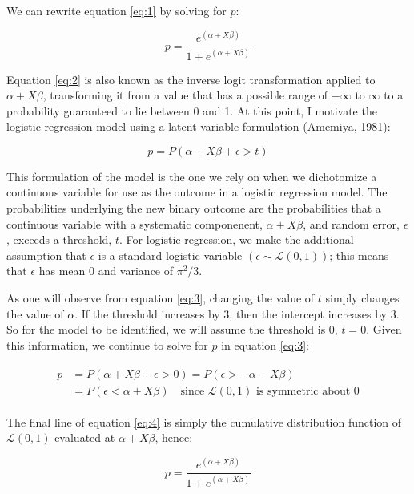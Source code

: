 \documentclass[
  english,
  doc]{apa6}
\begin{document}
We can rewrite equation \eqref{eq:1} by solving for \(p\):

\begin{equation} \label{eq:2}
p=\frac{e^{(\alpha+X\beta)}}{1+e^{(\alpha+X\beta)}}
\end{equation}

Equation \eqref{eq:2} is also known as the inverse logit transformation applied to \(\alpha+X\beta\), transforming it from a value that has a possible range of \(-\infty\) to \(\infty\) to a probability guaranteed to lie between 0 and 1. At this point, I motivate the logistic regression model using a latent variable formulation (Amemiya, 1981):

\begin{equation} \label{eq:3}
p=P(\alpha+X\beta+\epsilon>t)
\end{equation}

This formulation of the model is the one we rely on when we dichotomize a continuous variable for use as the outcome in a logistic regression model. The probabilities underlying the new binary outcome are the probabilities that a continuous variable with a systematic componenent, \(\alpha + X\beta\), and random error, \(\epsilon\), exceeds a threshold, \(t\). For logistic regression, we make the additional assumption that \(\epsilon\) is a standard logistic variable \((\epsilon\sim\mathcal{L}(0, 1))\); this means that \(\epsilon\) has mean 0 and variance of \(\pi^2/3\).

As one will observe from equation \eqref{eq:3}, changing the value of \(t\) simply changes the value of \(\alpha\). If the threshold increases by 3, then the intercept increases by 3. So for the model to be identified, we will assume the threshold is 0, \(t=0\). Given this information, we continue to solve for \(p\) in equation \eqref{eq:3}:

\begin{align}
\begin{split} \label{eq:4}
p
{}&=P(\alpha+X\beta+\epsilon>0)=P(\epsilon>-\alpha-X\beta) \\
{}&=P(\epsilon<\alpha+X\beta)\quad\text{since }\mathcal{L}(0, 1) \text{ is symmetric about 0}
\end{split}
\end{align}

The final line of equation \eqref{eq:4} is simply the cumulative distribution function of \(\mathcal{L}(0, 1)\) evaluated at \(\alpha + X\beta\), hence:

\begin{equation} \label{eq:5}
p=\frac{e^{(\alpha+X\beta)}}{1+e^{(\alpha+X\beta)}}
\end{equation}
\end{document}
